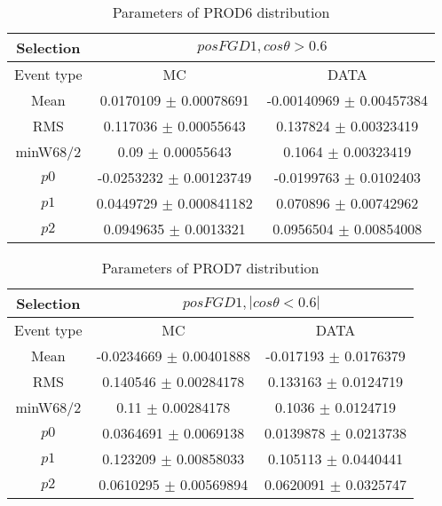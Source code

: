 \documentclass[a4paper,12pt]{article}
\begin{document}
\begin{table}[htbp]
\begin{center}
\begin{tabular}{|c|c|c|}
        \hline
        Selection & \multicolumn{2}{|c|}{$posFGD1, cos\theta>0.6$}  \\ \hline
        Event type & MC & DATA \\ 
        \hline
        Mean & 0.0170109 $\pm$ 0.00078691 & -0.00140969 $\pm$ 0.00457384 \\ 
        \hline 
        RMS & 0.117036 $\pm$ 0.00055643 & 0.137824 $\pm$ 0.00323419 \\ 
        \hline 
        minW68/2 & 0.09 $\pm$ 0.00055643 & 0.1064 $\pm$ 0.00323419 \\ 
        \hline 
        $p0$ & -0.0253232 $\pm$ 0.00123749 & -0.0199763 $\pm$ 0.0102403 \\ 
        \hline 
        $p1$ & 0.0449729 $\pm$ 0.000841182 & 0.070896 $\pm$ 0.00742962 \\ 
        \hline 
        $p2$ & 0.0949635 $\pm$ 0.0013321 & 0.0956504 $\pm$ 0.00854008 \\ 
        \hline 
\end{tabular}
\caption{Parameters of PROD6 distribution } \vspace{0.2in}
\label{xxx}
\end{center}
\end{table}

\begin{table}[htbp]
\begin{center}
\begin{tabular}{|c|c|c|}
        \hline
        Selection & \multicolumn{2}{|c|}{$posFGD1, |cos\theta<0.6|$}  \\ \hline
        Event type & MC & DATA \\ 
        \hline
        Mean & -0.0234669 $\pm$ 0.00401888 & -0.017193 $\pm$ 0.0176379 \\ 
        \hline 
        RMS & 0.140546 $\pm$ 0.00284178 & 0.133163 $\pm$ 0.0124719 \\ 
        \hline 
        minW68/2 & 0.11 $\pm$ 0.00284178 & 0.1036 $\pm$ 0.0124719 \\ 
        \hline 
        $p0$ & 0.0364691 $\pm$ 0.0069138 & 0.0139878 $\pm$ 0.0213738 \\ 
        \hline 
        $p1$ & 0.123209 $\pm$ 0.00858033 & 0.105113 $\pm$ 0.0440441 \\ 
        \hline 
        $p2$ & 0.0610295 $\pm$ 0.00569894 & 0.0620091 $\pm$ 0.0325747 \\ 
        \hline 
\end{tabular}
\caption{Parameters of PROD7 distribution } \vspace{0.2in}
\label{xxx}
\end{center}
\end{table}
\end{document}
